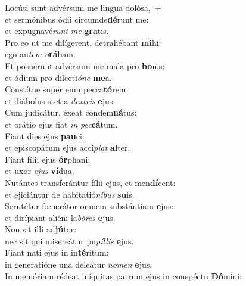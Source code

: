 \evenverse Locúti sunt advérsum me lingua dolósa,~+\\\evenverse  et sermónibus ódii circumde\textbf{dé}runt me:~\*\\
\evenverse et expugnavé\textit{runt} \textit{me} \textbf{gra}tis.\\
\oddverse Pro eo ut me dilígerent, detrahébant \textbf{mi}hi:~\*\\
\oddverse ego au\textit{tem} \textit{o}\textbf{rá}bam.\\
\evenverse Et posuérunt advérsum me mala pro \textbf{bo}nis:~\*\\
\evenverse et ódium pro dilecti\textit{ó}\textit{ne} \textbf{me}a.\\
\oddverse Constítue super eum pecca\textbf{tó}rem:~\*\\
\oddverse et diábolus stet a \textit{dex}\textit{tris} \textbf{e}jus.\\
\evenverse Cum judicátur, éxeat condem\textbf{ná}tus:~\*\\
\evenverse et orátio ejus fiat \textit{in} \textit{pec}\textbf{cá}tum.\\
\oddverse Fiant dies ejus \textbf{pau}ci:~\*\\
\oddverse et episcopátum ejus accí\textit{pi}\textit{at} \textbf{al}ter.\\
\evenverse Fiant fílii ejus \textbf{ór}phani:~\*\\
\evenverse et uxor \textit{e}\textit{jus} \textbf{ví}dua.\\
\oddverse Nutántes transferántur fílii ejus, et men\textbf{dí}cent:~\*\\
\oddverse et ejiciántur de habitatió\textit{ni}\textit{bus} \textbf{su}is.\\
\evenverse Scrutétur fœnerátor omnem substántiam \textbf{e}jus:~\*\\
\evenverse et dirípiant aliéni la\textit{bó}\textit{res} \textbf{e}jus.\\
\oddverse Non sit illi ad\textbf{jú}tor:~\*\\
\oddverse nec sit qui misereátur pu\textit{píl}\textit{lis} \textbf{e}jus.\\
\evenverse Fiant nati ejus in in\textbf{té}ritum:~\*\\
\evenverse in generatióne una deleátur \textit{no}\textit{men} \textbf{e}jus.\\
\oddverse In memóriam rédeat iníquitas patrum ejus in conspéctu \textbf{Dó}mini:~\*\\
